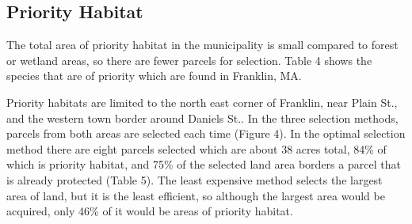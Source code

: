 \documentclass[12pt, stu, floatsintext,table]{apa7}
\begin{document}
\subsection{Priority Habitat} 
The total area of priority habitat in the municipality is small compared to forest or wetland areas, so there are fewer parcels for selection. Table 4 shows the species that are of priority which are found in Franklin, MA. 
\begin{table}[h]
\caption{Rare species found in Franklin, MA sorted by most recent observation}
\end{table}
Priority habitats are limited to the north east corner of Franklin, near Plain St., and the western town border around Daniels St.. In the three selection methods, parcels from both areas are selected each time (Figure 4). In the optimal selection method there are eight parcels selected which are about 38 acres total, 84\% of which is priority habitat, and 75\% of the selected land area borders a parcel that is already protected (Table 5). The least expensive method selects the largest area of land, but it is the least efficient, so although the largest area would be acquired, only 46\% of it would be areas of priority habitat. 
\end{document}
